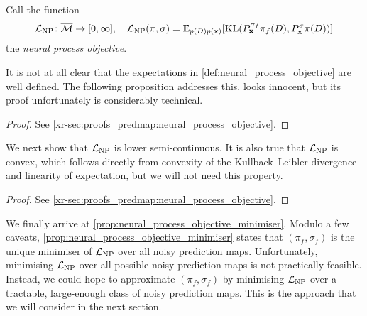 \documentclass[12pt, twoside]{report}
\newcommand{\xrprefix}[1]{xr-#1}
\begin{document}
\begin{definition} \label{def:neural_process_objective}
    Call the function
    \begin{equation}
        \L\ss{NP}\colon\overline{\M} \to [0, \infty], \quad \L\ss{NP}(\pi, \sigma)
        = \E_{p(D)p(\vx)}[\KL(P_\vx^{\sigma_f} \pi_f(D), P_\vx^{\sigma} \pi(D))]
    \end{equation}
    the \emph{neural process objective}.
\end{definition}

It is not at all clear that the expectations in \cref{def:neural_process_objective} are well defined.
The following proposition addresses this.
 looks innocent, but its proof unfortunately is considerably technical.

\begin{proof}
    See \cref{\xrprefix{sec:proofs_predmap:neural_process_objective}}.
\end{proof}

We next show that $\L\ss{NP}$ is lower semi-continuous.
It is also true that $\L\ss{NP}$ is convex, which follows directly from convexity of the Kullback--Leibler divergence \parencite[Lemma 7.2;][]{Gray:2011:Entropy_and_Information_Theory} and linearity of expectation, but we will not need this property.

\begin{proof}
    See \cref{\xrprefix{sec:proofs_predmap:neural_process_objective}}.
\end{proof}

We finally arrive at \cref{prop:neural_process_objective_minimiser}.
Modulo a few caveats, \cref{prop:neural_process_objective_minimiser} states that $(\pi_f, \sigma_f)$ is the unique minimiser of $\L\ss{NP}$ over all noisy prediction maps.
Unfortunately, minimising $\L\ss{NP}$ over all possible noisy prediction maps is not practically feasible.
Instead, we could hope to approximate $(\pi_f, \sigma_f)$ by minimising $\L\ss{NP}$ over a tractable, large-enough class of noisy prediction maps.
This is the approach that we will consider in the next section.
\end{document}
